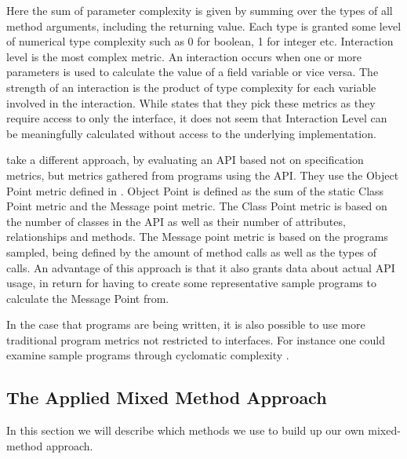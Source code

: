 Here the sum of parameter complexity is given by summing over the types of all method arguments, including the returning value.
Each type is granted some level of numerical type complexity such as 0 for boolean, 1 for integer etc.
Interaction level is the most complex metric.
An interaction occurs when one or more parameters is used to calculate the value of a field variable or vice versa.
The strength of an interaction is the product of type complexity for each variable involved in the interaction.
While \citet{de2009automatic} states that they pick these metrics as they require access to only the interface, it does not seem that Interaction Level can be meaningfully calculated without access to the underlying implementation. 

\citet{alatalo2013comparative} take a different approach, by evaluating an \gls{API} based not on specification metrics, but metrics gathered from programs using the \gls{API}.
They use the Object Point metric defined in \citet{sneed1995estimating}.
Object Point is defined as the sum of the static Class Point metric and the Message point metric.
The Class Point metric is based on the number of classes in the \gls{API} as well as their number of attributes, relationships and methods.
The Message point metric is based on the programs sampled, being defined by the amount of method calls as well as the types of calls.
An advantage of this approach is that it also grants data about actual \gls{API} usage, in return for having to create some representative sample programs to calculate the Message Point from.

In the case that programs are being written, it is also possible to use more traditional program metrics not restricted to interfaces.
For instance one could examine sample programs through cyclomatic complexity \cite{mccabe1976complexity}.

\subsection{The Applied Mixed Method Approach}
In this section we will describe which methods we use to build up our own mixed-method approach.
